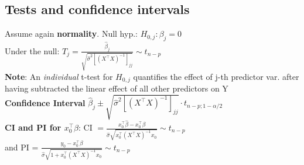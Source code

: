 \subsection*{Tests and confidence intervals}
Assume again \textbf{normality}. Null hyp.: $H_{0, j}: \beta_j = 0$ \\
Under the null: $T_j = \frac{\hat{\beta}_j}{\sqrt{\hat{\sigma}^2[(X^\intercal X)^{-1}]_{jj}}} \sim t_{n-p}$\\
\textbf{Note}: An \emph{individual} t-test for $H_{0,j}$ quantifies the effect of j-th predictor var. after having subtracted the linear effect of all other predictors on Y\\
\textbf{Confidence Interval} $\hat{\beta}_j \pm \sqrt{\hat{\sigma}^2[(X^\intercal X)^{-1}]_{jj}}\cdot t_{n-p;1-\alpha/2}$\\
\textbf{CI and PI for $x_0^\intercal \beta$}: CI $= \frac{x_0^\intercal \hat{\beta}-x_0^\intercal \beta}{\hat{\sigma}\sqrt{x_0^\intercal (X^\intercal X)^{-1}x_0}} \sim t_{n-p}$ \\ and PI = $\frac{y_0 - x_0^\intercal \beta}{\hat{\sigma}\sqrt{1+x_0^\intercal (X^\intercal X)^{-1}x_0}} \sim t_{n-p}$

